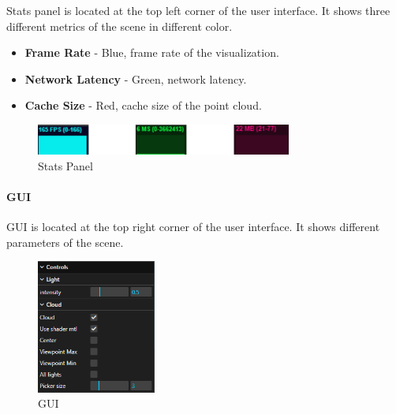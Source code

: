 \documentclass[11pt, a4paper,oneside,chapterprefix=false]{scrbook}
\begin{document}
Stats panel is located at the top left corner of the user interface. It shows three different metrics of the scene in different color.

\begin{itemize}
	\item \textbf{Frame Rate} - Blue, frame rate of the visualization.
	\item \textbf{Network Latency} - Green, network latency.
	\item \textbf{Cache Size} - Red, cache size of the point cloud.
\end{itemize}


\begin{figure}[H]
    \centering
    \includegraphics*[width=0.75\textwidth]{figures/stats panel.png}
    \caption{Stats Panel}
    \label{fig:stats panel}
\end{figure}

\paragraph{GUI}

GUI is located at the top right corner of the user interface. It shows different parameters of the scene.

\begin{minipage}{\textwidth}
	\begin{figure}[H]
		\centering
		\includegraphics*[width=0.35\textwidth]{figures/GUI.png}
		\caption{GUI}
		\label{fig:gui}
	\end{figure}
\end{minipage}
\end{document}
